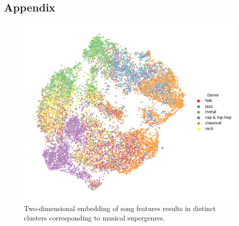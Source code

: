 \documentclass{article}
\begin{document}
\begin{appendix}
\section{Appendix}

\begin{figure}[h]
  \centering
  \includegraphics[width=1.0\textwidth]{../figures/tsne_genres.pdf}
  \caption{Two-dimensional embedding of song features results in distinct clusters corresponding to musical supergenres.}
  \label{fig:tsne_genres}
\end{figure}

\end{appendix}
\end{document}

